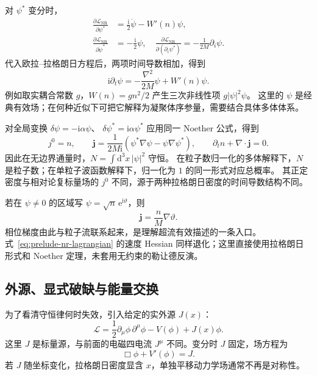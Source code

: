 对 $\psi^{*}$ 变分时，
\begin{align}
  \frac{\partial\mathcal{L}_{\mathrm{NR}}}{\partial\psi^{*}}
  &=\frac{\mathrm{i}}{2}\dot\psi-W'(n)\psi,\\
  \frac{\partial\mathcal{L}_{\mathrm{NR}}}{\partial\dot\psi^{*}}
  &=-\frac{\mathrm{i}}{2}\psi,
  \quad
  \frac{\partial\mathcal{L}_{\mathrm{NR}}}{\partial(\partial_{i}\psi^{*})}
  =-\frac{1}{2M}\partial_{i}\psi.
\end{align}
代入欧拉--拉格朗日方程后，两项时间导数相加，得到
\begin{equation}
  \mathrm{i}\partial_{t}\psi
  =-\frac{\nabla^{2}}{2M}\psi+W'(n)\psi.
  \label{eq:prelude-nonlinear-schrodinger}
\end{equation}
例如取实耦合常数 $g$，$W(n)=g n^{2}/2$ 产生三次非线性项 $g|\psi|^{2}\psi$。
这里的 $\psi$ 是经典有效场；在何种近似下可把它解释为凝聚体序参量，需要结合具体多体体系。

对全局变换 $\delta\psi=-\mathrm{i}\alpha\psi$、
$\delta\psi^{*}=\mathrm{i}\alpha\psi^{*}$ 应用同一 Noether 公式，得到
\begin{equation}
  j^{0}=n,\qquad
  \bm{j}=\frac{1}{2M\mathrm{i}}
  (\psi^{*}\nabla\psi-\psi\nabla\psi^{*}),
  \qquad \partial_{t}n+\nabla\cdot\bm{j}=0.
\end{equation}
因此在无边界通量时，$N=\int\mathrm{d}^{3}x\,|\psi|^{2}$ 守恒。
在粒子数归一化的多体解释下，$N$ 是粒子数；在单粒子波函数解释下，归一化为 $1$ 的同一形式对应总概率。
其正定密度与相对论复标量场的 $j^{0}$ 不同，源于两种拉格朗日密度的时间导数结构不同。

若在 $\psi\neq0$ 的区域写 $\psi=\sqrt{n}\,\mathrm{e}^{\mathrm{i}\vartheta}$，则
\begin{equation}
  \bm{j}=\frac{n}{M}\nabla\vartheta.
\end{equation}
相位梯度由此与粒子流联系起来，是理解超流有效描述的一条入口。
式~\eqref{eq:prelude-nr-lagrangian} 的速度 Hessian 同样退化；这里直接使用拉格朗日形式和 Noether 定理，未套用无约束的勒让德反演。

\subsection{外源、显式破缺与能量交换}

为了看清守恒律何时失效，引入给定的实外源 $J(x)$：
\begin{equation}
  \mathcal{L}=\frac12\partial_{\mu}\phi\,\partial^{\mu}\phi-V(\phi)+J(x)\phi.
  \label{eq:prelude-source-lagrangian}
\end{equation}
这里 $J$ 是标量源，与前面的电磁四电流 $J^{\mu}$ 不同。变分时 $J$ 固定，场方程为
\begin{equation}
  \Box\phi+V'(\phi)=J.
\end{equation}
若 $J$ 随坐标变化，拉格朗日密度显含 $x$，单独平移动力学场通常不再是对称性。

